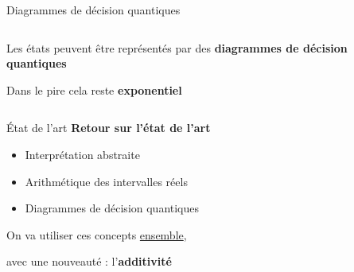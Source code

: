 \begin{frame}{Diagrammes de décision quantiques}
    \begin{columns}
        \begin{column}{0.7\textwidth}
            Les états peuvent être représentés par des \textbf{diagrammes de décision quantiques}

            \vspace{1em}

            Dans le pire cela reste \textbf{exponentiel}
        \end{column}
    \begin{column}{0.3\textwidth}
        \end{column}
    \end{columns}
\end{frame}

\begin{frame}{État de l'art}
    \textbf{Retour sur l'état de l'art}
    \begin{itemize}
        \item[\checkmark] Interprétation abstraite
        \item[\checkmark] Arithmétique des intervalles réels
        \item[\checkmark] Diagrammes de décision quantiques
    \end{itemize}
    \begin{center}
        On va utiliser ces concepts \underline{ensemble},

        avec une nouveauté : l'\textbf{additivité}
\vfill
\end{center}
\end{frame}

